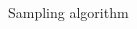 \documentclass[10pt]{beamer}
\begin{document}
\begin{frame}{Sampling algorithm}
\begin{columns}
\begin{column}[]{0.4 \textwidth}
\begin{figure}[t!]
\begin{center}
                \end{center}
              \end{figure}
        \end{column}
    \end{columns}
\end{frame}
\end{document}
